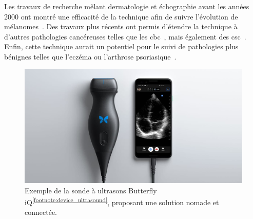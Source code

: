Les travaux de recherche mêlant dermatologie et échographie avant les années 2000 ont montré une efficacité de la technique afin de suivre l'évolution de mélanomes~\cite{Cammarota1998}. Des travaux plus récents ont permis d'étendre la technique à d'autres pathologies cancéreuses telles que les \gls{cbc}~\cite{Barcaui2014}, mais également des \gls{csc}~\cite{Catalano2010}. Enfin, cette technique aurait un potentiel pour le suivi de pathologies plus bénignes telles que l'eczéma ou l'arthrose psoriasique~\cite{Bhatta2018}.\par

\begin{figure}[H]
    \centering
    \includegraphics[width=\linewidth]{contents/chapter_2/resources/exemple_ultrasound.jpg}
    \caption{Exemple de la sonde à ultrasons Butterfly iQ\textsuperscript{\ref{footnote:device_ultrasound}}, proposant une solution nomade et connectée.}
    \label{fig:exemple_ultrasound}
\end{figure}\par

\addtocounter{footnote}{1}
